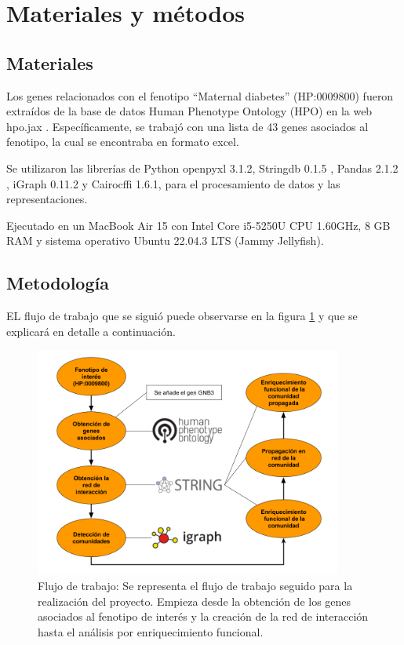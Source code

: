 \section{Materiales y métodos}

\subsection{Materiales}
Los genes relacionados con el fenotipo ``Maternal diabetes'' (HP:0009800) fueron extraídos de la base de datos Human Phenotype Ontology (HPO) en la web hpo.jax \cite{Kohler2017}. Específicamente, se trabajó con una lista de 43 genes asociados al fenotipo, la cual se encontraba en formato excel.

Se utilizaron las librerías de Python
openpyxl 3.1.2, Stringdb 0.1.5 \cite{Mering2005}, Pandas 2.1.2 \cite{McKinney2015}, iGraph 0.11.2 \cite{Csardi2006} y Cairocffi 1.6.1, para el procesamiento de datos y las representaciones.


Ejecutado en un MacBook Air 15 con Intel Core i5-5250U CPU 1.60GHz, 8 GB RAM y sistema operativo Ubuntu 22.04.3 LTS (Jammy Jellyfish).

\subsection{Metodología}

EL flujo de trabajo que se siguió puede observarse en la figura \ref{fig:workflow} y que se explicará en detalle a continuación.

\begin{figure}[h!]
	\includegraphics[width=0.9\textwidth]{figures/workflow.png}
	\caption{Flujo de trabajo: Se representa el flujo de trabajo seguido para la realización del proyecto. Empieza desde la obtención de los genes asociados al fenotipo de interés y la creación de la red de interacción hasta el análisis por enriquecimiento funcional.}
	\label{fig:workflow}
\end{figure}

